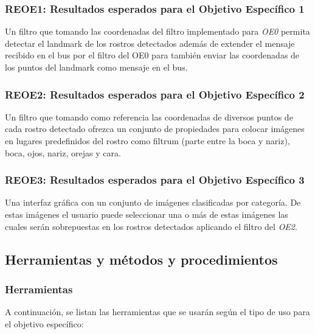 \documentclass[a4paper,openright,12pt]{report}
\begin{document}
\subsubsection{REOE1: Resultados esperados para el Objetivo Específico 1}
Un filtro que tomando las coordenadas del filtro implementado para \textit{OE0}
permita detectar el landmark de los rostros detectados además de extender el
mensaje recibido en el bus por el filtro del OE0 para también enviar las
coordenadas de los puntos del landmark como mensaje en el bus.
\subsubsection{REOE2: Resultados esperados para el Objetivo Específico 2}
Un filtro que tomando como referencia las coordenadas de diversos puntos de cada
rostro detectado ofrezca un conjunto de propiedades para colocar imágenes en
lugares predefinidos del rostro como filtrum (parte entre la boca y nariz),
boca, ojos, nariz, orejas y cara.
\subsubsection{REOE3: Resultados esperados para el Objetivo Específico 3}
Una interfaz gráfica con un conjunto de imágenes clasificadas por categoría. De
estas imágenes el usuario puede seleccionar una o más de estas imágenes las
cuales serán sobrepuestas en los rostros detectados aplicando el filtro del
\textit{OE2}.

\subsection{Herramientas y métodos y procedimientos}
\subsubsection{Herramientas}
A continuación, se listan las herramientas que se usarán según el tipo de uso
para el objetivo específico:
\end{document}
